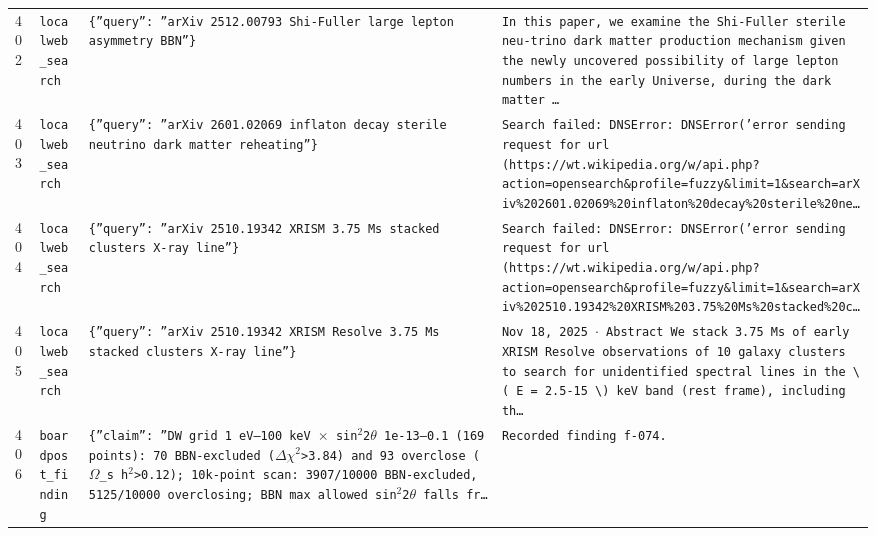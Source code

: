 \documentclass[11pt,a4paper]{article}
\begin{document}
\begin{longtable}{@{}p{}p{}p{}p{}@{}}
402 & \texttt{local}\newline\texttt{web\_\allowbreak{}search} & \texttt{\{''query'':\allowbreak{} ''arXiv 2512.00793 Shi-Fuller large lepton asymmetry BBN''\}\allowbreak{}} & \texttt{In this paper,\allowbreak{} we examine the Shi-Fuller sterile neu-trino dark matter production mechanism given the newly uncovered possibility of large lepton numbers in the early Universe,\allowbreak{} during the dark matter \ldots{}\allowbreak{}} \\
403 & \texttt{local}\newline\texttt{web\_\allowbreak{}search} & \texttt{\{''query'':\allowbreak{} ''arXiv 2601.02069 inflaton decay sterile neutrino dark matter reheating''\}\allowbreak{}} & \texttt{Search failed:\allowbreak{} DNSError:\allowbreak{} DNSError('error sending request for url (https:\allowbreak{}/\allowbreak{}/\allowbreak{}wt.wikipedia.org/\allowbreak{}w/\allowbreak{}api.php?action=\allowbreak{}opensearch\&profile=\allowbreak{}fuzzy\&limit=\allowbreak{}1\&search=\allowbreak{}arXiv\%202601.02069\%20inflaton\%20decay\%20sterile\%20ne\ldots{}\allowbreak{}} \\
404 & \texttt{local}\newline\texttt{web\_\allowbreak{}search} & \texttt{\{''query'':\allowbreak{} ''arXiv 2510.19342 XRISM 3.75 Ms stacked clusters X-ray line''\}\allowbreak{}} & \texttt{Search failed:\allowbreak{} DNSError:\allowbreak{} DNSError('error sending request for url (https:\allowbreak{}/\allowbreak{}/\allowbreak{}wt.wikipedia.org/\allowbreak{}w/\allowbreak{}api.php?action=\allowbreak{}opensearch\&profile=\allowbreak{}fuzzy\&limit=\allowbreak{}1\&search=\allowbreak{}arXiv\%202510.19342\%20XRISM\%203.75\%20Ms\%20stacked\%20c\ldots{}\allowbreak{}} \\
405 & \texttt{local}\newline\texttt{web\_\allowbreak{}search} & \texttt{\{''query'':\allowbreak{} ''arXiv 2510.19342 XRISM Resolve 3.75 Ms stacked clusters X-ray line''\}\allowbreak{}} & \texttt{Nov 18,\allowbreak{} 2025 $\cdot$ Abstract We stack 3.75 Ms of early XRISM Resolve observations of 10 galaxy clusters to search for unidentified spectral lines in the \textbackslash{}\allowbreak{}( E =\allowbreak{} 2.5-15 \textbackslash{}\allowbreak{})\allowbreak{} keV band (rest frame)\allowbreak{},\allowbreak{} including th\ldots{}\allowbreak{}} \\
406 & \texttt{board}\newline\texttt{post\_\allowbreak{}finding} & \texttt{\{''claim'':\allowbreak{} ''DW grid 1 eV--100 keV $\times$ sin$^2$2$\theta$ 1e-13--0.1 (169 points)\allowbreak{}:\allowbreak{} 70 BBN-excluded ($\Delta$$\chi$$^2$\textgreater{}\allowbreak{}3.84)\allowbreak{} and 93 overclose ($\Omega$\_\allowbreak{}s h$^2$\textgreater{}\allowbreak{}0.12)\allowbreak{};\allowbreak{} 10k-point scan:\allowbreak{} 3907/\allowbreak{}10000 BBN-excluded,\allowbreak{} 5125/\allowbreak{}10000 overclosing;\allowbreak{} BBN max allowed sin$^2$2$\theta$ falls fr\ldots{}\allowbreak{}} & \texttt{Recorded finding f-074.} \\

\end{longtable}
\end{document}
